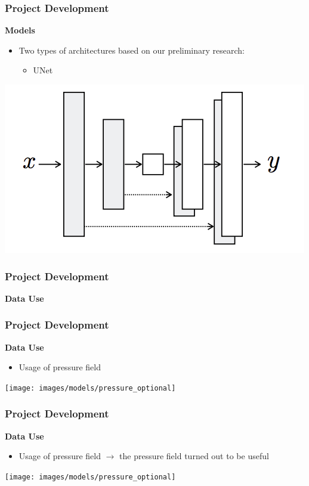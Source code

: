 \documentclass[18pt]{beamer}
\begin{document}
\begin{frame}[t]
  \frametitle{Project Development}
  \large{\textbf{Models}}
  \begin{itemize}
  \item Two types of architectures based on our preliminary research:
    \begin{itemize}
    \item UNet
    \end{itemize}
  \end{itemize}
  \vspace{1cm}
  \begin{center}
    \includegraphics[scale=0.37]{images/nets/unet}
  \end{center}  
\end{frame}


\begin{frame}[t]
  \frametitle{Project Development}
  \large{\textbf{Data Use}}
\end{frame}


\begin{frame}[t]
  \frametitle{Project Development}
  \large{\textbf{Data Use}}
  \begin{itemize}
  \item Usage of pressure field
  \end{itemize}
  \vspace{0.5cm}
  \begin{center}
    \texttt{[image: images/models/pressure\_optional]}
  \end{center}  
\end{frame}


\begin{frame}[t]
  \frametitle{Project Development}
  \large{\textbf{Data Use}}
  \begin{itemize}
  \item Usage of pressure field $\rightarrow$ the pressure field turned out to be useful
  \end{itemize}
  \vspace{0.5cm}
  \begin{center}
    \texttt{[image: images/models/pressure\_optional]}
  \end{center}  
\end{frame}
\end{document}
